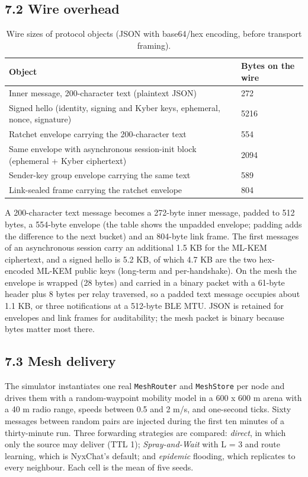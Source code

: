 \documentclass[conference]{IEEEtran}
\begin{document}
\subsection{7.2 Wire overhead}
\begin{table}[t]\centering\footnotesize
\caption{Wire sizes of protocol objects (JSON with base64/hex encoding, before transport framing).}
\begin{tabular}{ll}\toprule
Object & Bytes on the wire \\ \midrule
Inner message, 200-character text (plaintext JSON) & 272 \\
Signed hello (identity, signing and Kyber keys, ephemeral, nonce, signature) & 5216 \\
Ratchet envelope carrying the 200-character text & 554 \\
Same envelope with asynchronous session-init block (ephemeral + Kyber ciphertext) & 2094 \\
Sender-key group envelope carrying the same text & 589 \\
Link-sealed frame carrying the ratchet envelope & 804 \\
\bottomrule\end{tabular}\end{table}
A 200-character text message becomes a 272-byte inner message, padded to 512 bytes, a 554-byte envelope (the table shows the unpadded envelope; padding adds the difference to the next bucket) and an 804-byte link frame. The first messages of an asynchronous session carry an additional 1.5 KB for the ML-KEM ciphertext, and a signed hello is 5.2 KB, of which 4.7 KB are the two hex-encoded ML-KEM public keys (long-term and per-handshake). On the mesh the envelope is wrapped (28 bytes) and carried in a binary packet with a 61-byte header plus 8 bytes per relay traversed, so a padded text message occupies about 1.1 KB, or three notifications at a 512-byte BLE MTU. JSON is retained for envelopes and link frames for auditability; the mesh packet is binary because bytes matter most there.

\subsection{7.3 Mesh delivery}
The simulator instantiates one real \texttt{MeshRouter} and \texttt{MeshStore} per node and drives them with a random-waypoint mobility model in a 600 x 600 m arena with a 40 m radio range, speeds between 0.5 and 2 m/s, and one-second ticks. Sixty messages between random pairs are injected during the first ten minutes of a thirty-minute run. Three forwarding strategies are compared: \emph{direct}, in which only the source may deliver (TTL 1); \emph{Spray-and-Wait} with L = 3 and route learning, which is NyxChat's default; and \emph{epidemic} flooding, which replicates to every neighbour. Each cell is the mean of five seeds.
\end{document}
